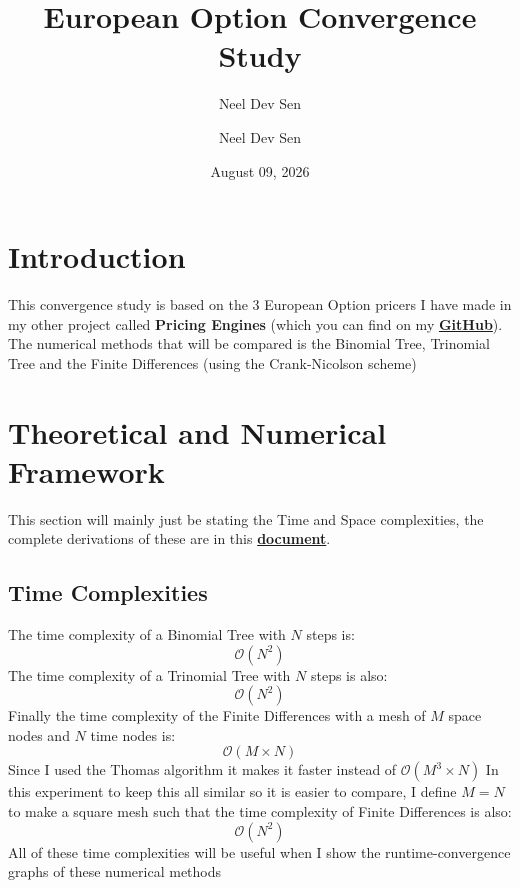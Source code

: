 \documentclass[12pt]{article}
\title{
	\textbf{European Option Convergence Study}\\[0.0em]
}
\author{Neel Dev Sen}
\date{August 09, 2026}
\author{Neel Dev Sen}
\numberwithin{equation}{section}
\begin{document}
    \maketitle
	\newpage
	\tableofcontents
	\newpage
	
	\newpage
	\setcounter{section}{0}
	
	
\section*{Introduction}
This convergence study is based on the 3 European Option pricers I have made in my other project called \textbf{Pricing Engines} (which you can find on my \href{https://github.com/neeldevsen/pricing-engines/tree/main}{\textbf{GitHub}}). The numerical methods that will be compared is the Binomial Tree, Trinomial Tree and the Finite Differences (using the Crank-Nicolson scheme)

\section{Theoretical  and Numerical Framework}
This section will mainly just be stating the Time and Space complexities, the complete derivations of these are in this \href{https://github.com/neeldevsen/pricing-engines/blob/main/PricingEngines.pdf}{\textbf{document}}. 
\subsection{Time Complexities}
The time complexity of a Binomial Tree with $N$ steps is:
\begin{equation}
	\boxed{\mathcal{O}(N^2)}
\end{equation}
The time complexity of a Trinomial Tree with $N$ steps is also:
\begin{equation}
	\boxed{\mathcal{O}(N^2)}
\end{equation}
Finally the time complexity of the Finite Differences with a mesh of $M$ space nodes and $N$ time nodes is:
\begin{equation}
	\boxed{\mathcal{O}(M\times N)}
\end{equation}
Since I used the Thomas algorithm it makes it faster instead of $\mathcal{O}(M^3\times N)$
In this experiment to keep this all similar so it is easier to compare, I define $M=N$ to make a square mesh such that the time complexity of Finite Differences is also:
\begin{equation}
	\boxed{\mathcal{O}(N^2)}
\end{equation}
All of these time complexities will be useful when I show the runtime-convergence graphs of these numerical methods
\end{document}
